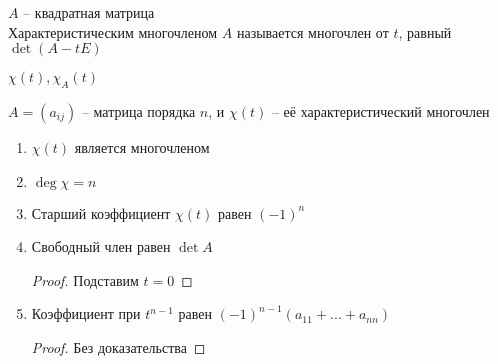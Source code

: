 \begin{definition}
	$ A $ -- квадратная матрица \\
	Характеристическим многочленом $ A $ называется многочлен от $ t $, равный $ \det(A - tE) $
\end{definition}

\begin{notation}
	$ \chi(t), \chi_A(t) $
\end{notation}

\begin{properties}
	$ A = (a_{ij}) $ -- матрица порядка $ n $, и $ \chi(t) $ -- её характеристический многочлен
	\begin{enumerate}
		\item $ \chi(t) $ является многочленом
		\item $ \deg \chi = n $
		\item Старший коэффициент $ \chi(t) $ равен $ (-1)^n $
		\item Свободный член равен $ \det A $
		\begin{proof}
			Подставим $ t = 0 $
		\end{proof}
		\item Коэффициент при $ t^{n - 1} $ равен $ (-1)^{n - 1}(a_{11} + ... + a_{nn}) $
		\begin{proof}
			Без доказательства
		\end{proof}
	\end{enumerate}
\end{properties}

